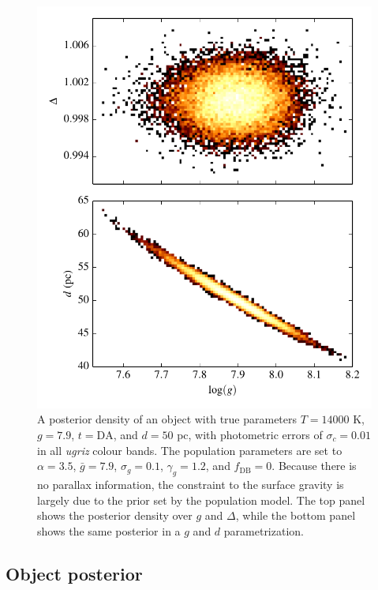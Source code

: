\documentclass[fleqn,usenatbib]{mnras}
\newcommand{\Teff}{T}
\newcommand{\logg}{g}
\begin{document}
\begin{figure}
	\includegraphics[width=\columnwidth]{banana.pdf}
    \caption{A posterior density of an object with true parameters $\Teff=14000$ K, $\logg=7.9$, $t=\text{DA}$, and $d=50$ pc, with photometric errors of $\sigma_c=0.01$ in all \emph{ugriz} colour bands. The population parameters are set to $\alpha=3.5$, $\bar{g}=7.9$, $\sigma_g=0.1$, $\gamma_g=1.2$, and $f_\text{DB}=0$. Because there is no parallax information, the constraint to the surface gravity is largely due to the prior set by the population model. The top panel shows the posterior density over $\logg$ and $\Delta$, while the bottom panel shows the same posterior in a $\logg$ and $d$ parametrization.}
    \label{fig:banana}
\end{figure}







\subsection{Object posterior}\label{sec:objectposterior}
\end{document}
